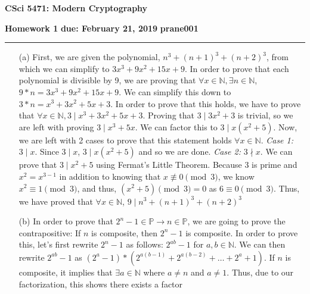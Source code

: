 \documentclass[11pt]{article}
\newcounter{qnum}
\newcommand{\question}[1]{\stepcounter{qnum}\bigskip\noindent{\bf \arabic{qnum}. #1.}}
\newcommand\NetIDa{prane001}
\begin{document}
\begin{center}
{\Large \bf CSci 5471: Modern Cryptography}
\end{center}
{\bf Homework 1} \hfill {\bf due: February 21, 2019}
\newline
{\bf \NetIDa} \hfill  

\medskip
\hrule
\medskip

\question{Number Theory I}
\begin{itemize}
  \item[(a)]   
    First, we are given the polynomial, $n^{3}  + (n+1)^{3} + (n+2)^{3}$, from which we can 
    simplify  to $3 x^{3} + 9 x^{2} + 15 x + 9$. In order to prove that each polynomial is
    divisible by 9, we are proving that $\forall x \in \mathbb{N},  \exists n \in \mathbb{N}$, 
    $9* n =  3 x^{3} + 9 x^{2} + 15 x + 9$. We can simplify this down to
    $3* n =   x^{3} + 3 x^{2} + 5 x + 3$. In order to prove that this holds, we have to prove 
    that $\forall x \in \mathbb{N},  3 \mid x^{3} + 3x^{2} + 5x + 3$. Proving that 
    $3 \mid 3x^{2} + 3$ is trivial, so we are left with proving $3 \mid x^{3} + 5x$. We can factor
    this to $3 \mid x(x^{2} + 5)$. Now, we are left with 2 cases to prove that this statement
    holds $\forall x \in \mathbb{N}$. 
    \newline \textit{Case 1:} $3\mid x$. Since $3\mid x$, $3 \mid x(x^{2} + 5)$ and so we are done.
    \newline \textit{Case 2:} $3\nmid x$. We can prove that $3\mid x^{2} + 5$ using 
    Fermat's Little Theorem. Because 3 is prime and $x^{2} = x^{3-1}$ in addition to knowing
    that $x \not \equiv 0 \pmod{3}$, we know 
    $x^{2} \equiv 1 \pmod{3}$, and thus, $(x^{2} + 5) \pmod{3} = 0$ as $6 \equiv 0 \pmod{3}$. 
    \newline Thus, we have proved that $\forall x \in \mathbb{N}$, $9 \mid n^{3}  + (n+1)^{3} +
    (n+2)^{3}$
  \item[(b)]
    In order to prove that $2^{n} -1 \in \mathbb{P} \rightarrow n \in \mathbb{P}$, we are going to 
    prove the contrapositive: If $n$ is composite, then $2^{n} -1$ is composite. In order to prove
    this, let's first rewrite $2^{n} -1$ as follows: $2^{ab} -1$ for $a,b \in \mathbb{N}$. 
    We can then rewrite $2^{ab} -1$ as $(2^{a} -1) * (2^{a(b-1)} + 2^{a(b-2)} +
    \dots + 2^{a} + 1)$. If $n$ is composite, it implies that $\exists a \in \mathbb{N}$ where
    $a \neq n$ and $a \neq 1$. Thus, due to our factorization, this shows there exists a factor

\end{itemize}
\end{document}
